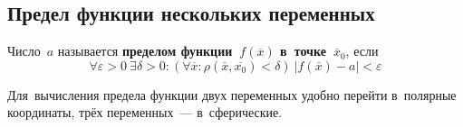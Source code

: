 \subsection{Предел функции нескольких переменных}
Число~$a$ называется \textbf{пределом функции~$f(\overline x)$ в~точке~$\overline x_0$}, если
\begin{equation*}
\forall \varepsilon > 0 \ \exists \delta > 0 \colon (\forall \overline x \colon \rho(\overline x, \overline{x_0}) < \delta) \ |f(\overline x) - a| < \varepsilon
\end{equation*}

Для~вычисления предела функции двух переменных удобно перейти в~полярные координаты, трёх переменных~--- в~сферические.